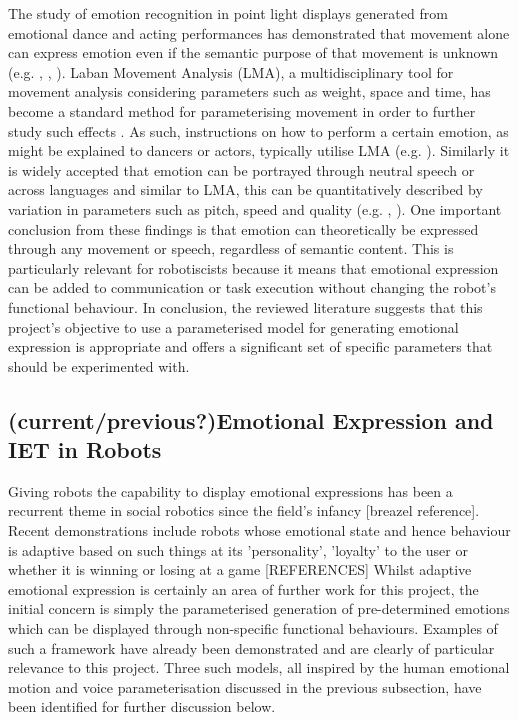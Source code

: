 \documentclass[11pt]{article}
\begin{document}
The study of emotion recognition in point light displays generated from emotional dance and acting performances has demonstrated that movement alone can express emotion even if the semantic purpose of that movement is unknown (e.g. \cite{dittrich1996perception}, \cite{pollick2001perceiving}, \cite{atkinson2004emotion}). Laban Movement Analysis (LMA), a multidisciplinary tool for movement analysis considering parameters such as weight, space and time, has become a standard method for parameterising movement in order to further study such effects \cite{lab2011}. As such, instructions on how to perform a certain emotion, as might be explained to dancers or actors, typically utilise LMA (e.g. \cite{newlove1993laban}). Similarly it is widely accepted that emotion can be portrayed through neutral speech \cite{neumann2000mood} or across languages \cite{scherer2000cross} and similar to LMA, this can be quantitatively described by variation in parameters such as pitch, speed and quality (e.g. \cite{scherer1986vocal}, \cite{cowie2001emotion}). One important conclusion from these findings is that emotion can theoretically be expressed through any movement or speech, regardless of semantic content. This is particularly relevant for robotiscists because it means that emotional expression can be added to communication or task execution without changing the robot's functional behaviour. In conclusion, the reviewed literature suggests that this project's objective to use a parameterised model for generating emotional expression is appropriate and offers a significant set of specific parameters that should be experimented with.

\subsection{(current/previous?)Emotional Expression and IET in Robots}
Giving robots the capability to display emotional expressions has been a recurrent theme in social robotics since the field's infancy [breazel reference]. Recent demonstrations include robots whose emotional state and hence behaviour is adaptive based on such things at its 'personality', 'loyalty' to the user or whether it is winning or losing at a game [REFERENCES] Whilst adaptive emotional expression is certainly an area of further work for this project, the initial concern is simply the parameterised generation of pre-determined emotions which can be displayed through non-specific functional behaviours. Examples of such a framework have already been demonstrated and are clearly of particular relevance to this project. Three such models, all inspired by the human emotional motion and voice parameterisation discussed in the previous subsection, have been identified for further discussion below.  
\end{document}

